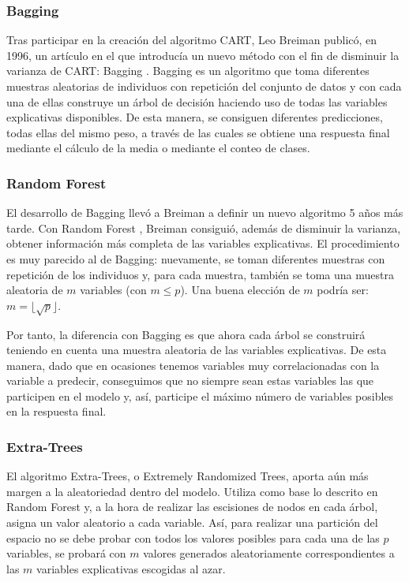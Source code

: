 \documentclass[12pt,twoside]{article}
\begin{document}
\subsubsection{Bagging}
Tras participar en la creación del algoritmo CART, Leo Breiman publicó, en 1996, un artículo en el que introducía un nuevo método con el fin de disminuir la varianza de CART: Bagging \cite{BR01}. Bagging es un algoritmo que toma diferentes muestras aleatorias de individuos con repetición del conjunto de datos y con cada una de ellas construye un árbol de decisión haciendo uso de todas las variables explicativas disponibles. De esta manera, se consiguen diferentes predicciones, todas ellas del mismo peso, a través de las cuales se obtiene una respuesta final mediante el cálculo de la media o mediante el conteo de clases.


\subsubsection{Random Forest}
El desarrollo de Bagging llevó a Breiman a definir un nuevo algoritmo 5 años más tarde. Con Random Forest \cite{BR02}, Breiman consiguió, además de disminuir la varianza, obtener información más completa de las variables explicativas. El procedimiento es muy parecido al de Bagging: nuevamente, se toman diferentes muestras con repetición de los individuos y, para cada muestra, también se toma una muestra aleatoria de $m$ variables (con $m \leq p$). Una buena elección de $m$ podría ser: $ m = \lfloor \sqrt{p} \rfloor$.

Por tanto, la diferencia con Bagging es que ahora cada árbol se construirá teniendo en cuenta una muestra aleatoria de las variables explicativas. De esta manera, dado que en ocasiones tenemos variables muy correlacionadas con la variable a predecir, conseguimos que no siempre sean estas variables las que participen en el modelo y, así, participe el máximo número de variables posibles en la respuesta final.


\subsubsection{Extra-Trees} \label{sec:ExtraTrees}
El algoritmo Extra-Trees, o Extremely Randomized Trees, aporta aún más margen a la aleatoriedad dentro del modelo. Utiliza como base lo descrito en Random Forest y, a la hora de realizar las escisiones de nodos en cada árbol, asigna un valor aleatorio a cada variable. Así, para realizar una partición del espacio no se debe probar con todos los valores posibles para cada una de las $p$ variables, se probará con $m$ valores generados aleatoriamente correspondientes a las $m$ variables explicativas escogidas al azar.
\end{document}
